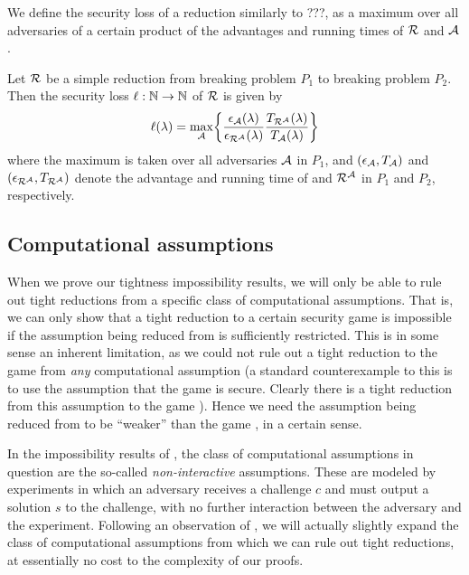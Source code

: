 We define the security loss of a reduction \redR similarly to ???,
as a maximum over all adversaries \advA of a certain product of the
advantages and running times of \(\redR\) and \(\mathcal{A}\).

\begin{definition}\label{def:loss}
  Let \(\redR\) be a simple reduction
  from breaking problem \(P_{1}\) to breaking problem \(P_{2}\).
  Then the security loss \(\ell : \mathbb{N} \to \mathbb{N}\) of \(\redR\) is given by
  \begin{equation}
    \ell(\lambda) = \max_{\advA} \left\{ \frac{\epsilon_{\advA}(\lambda)}{\epsilon_{\redR^{\advA}}(\lambda)}\frac{T_{\redR^{\advA}}(\lambda)}{T_{\advA}(\lambda)} \right\}
  \end{equation}
  where the maximum is taken over all adversaries \(\mathcal{A}\) in \(P_{1}\),
  and \((\epsilon_{\mathcal{A}}, T_{\mathcal{A}})\) and \((\epsilon_{\redR^{\advA}}, T_{\redR^{\advA}})\)
  denote the advantage and running time of \advA and \(\redR^{\advA}\) in \(P_{1}\) and \(P_{2}\), respectively.
\end{definition}




\subsection{Computational assumptions}

When we prove our tightness impossibility results,
we will only be able to rule out tight reductions from a specific class of computational assumptions.
That is, we can only show that a tight reduction to a certain security game \gameG is impossible
if the assumption being reduced from is sufficiently restricted.
This is in some sense an inherent limitation, as we could not rule out a tight reduction to the game \gameG
from \emph{any} computational assumption
(a standard counterexample to this is to use the assumption that the game \gameG is secure.
Clearly there is a tight reduction from this assumption to the game \gameG).
Hence we need the assumption being reduced from to be ``weaker''
than the game \gameG, in a certain sense.

In the impossibility results of , the class of computational assumptions
in question are the so-called \emph{non-interactive} assumptions.
These are modeled by experiments in which an adversary receives a challenge \(c\)
and must output a solution \(s\) to the challenge, with no further interaction between the adversary and the experiment.
Following an observation of , we will actually slightly expand the class of computational assumptions
from which we can rule out tight reductions, at essentially no cost to the complexity of our proofs.

